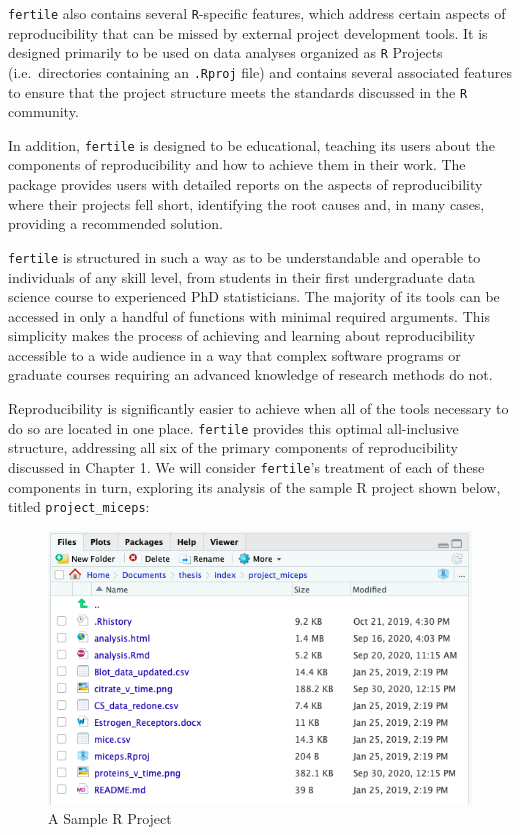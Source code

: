 \documentclass[12pt,twoside]{reedthesis}
\begin{document}
\texttt{fertile} also contains several \texttt{R}-specific features,
which address certain aspects of reproducibility that can be missed by
external project development tools. It is designed primarily to be used
on data analyses organized as \texttt{R} Projects (i.e.~directories
containing an \texttt{.Rproj} file) and contains several associated
features to ensure that the project structure meets the standards
discussed in the \texttt{R} community.

In addition, \texttt{fertile} is designed to be educational, teaching
its users about the components of reproducibility and how to achieve
them in their work. The package provides users with detailed reports on
the aspects of reproducibility where their projects fell short,
identifying the root causes and, in many cases, providing a recommended
solution.

\texttt{fertile} is structured in such a way as to be understandable and
operable to individuals of any skill level, from students in their first
undergraduate data science course to experienced PhD statisticians. The
majority of its tools can be accessed in only a handful of functions
with minimal required arguments. This simplicity makes the process of
achieving and learning about reproducibility accessible to a wide
audience in a way that complex software programs or graduate courses
requiring an advanced knowledge of research methods do not.

Reproducibility is significantly easier to achieve when all of the tools
necessary to do so are located in one place. \texttt{fertile} provides
this optimal all-inclusive structure, addressing all six of the primary
components of reproducibility discussed in Chapter 1. We will consider
\texttt{fertile}'s treatment of each of these components in turn,
exploring its analysis of the sample R project shown below, titled
\texttt{project\_miceps}:
\begin{figure}
\includegraphics[width=1\linewidth]{figure/sample-project} \caption{A Sample R Project}\label{fig:unnamed-chunk-9}
\end{figure}
\end{document}
